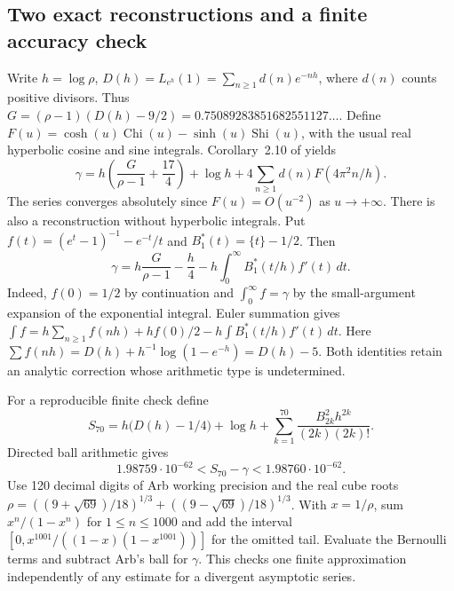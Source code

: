 \documentclass[11pt,a4paper]{article}
\theoremstyle{definition}\newtheorem{definition}[theorem]{Definition}\newtheorem{example}[theorem]{Example}
\theoremstyle{remark}\newtheorem{remark}[theorem]{Remark}
\begin{document}
\subsection{Two exact reconstructions and a finite accuracy check}
Write $h=\log\rho$, $D(h)=L_{e^h}(1)=\sum_{n\ge1}d(n)e^{-nh}$, where $d(n)$ counts positive divisors. Thus
$G=(\rho-1)(D(h)-9/2)=0.75089283851682551127\ldots$.
Define $F(u)=\cosh(u)\operatorname{Chi}(u)-\sinh(u)\operatorname{Shi}(u)$, with the usual real hyperbolic cosine and sine integrals. Corollary~2.10 of \cite{DKK} yields
\begin{equation}\label{eq:plastic-wigert}
 \gamma=h\left(\frac{G}{\rho-1}+\frac{17}{4}\right)+\log h+
 4\sum_{n\ge1}d(n)F(4\pi^2n/h).
\end{equation}
The series converges absolutely since $F(u)=O(u^{-2})$ as $u\to+\infty$.
There is also a reconstruction without hyperbolic integrals. Put
$f(t)=(e^t-1)^{-1}-e^{-t}/t$ and $B_1^*(t)=\{t\}-1/2$. Then
\begin{equation}\label{eq:plastic-euler}
 \gamma=h\frac{G}{\rho-1}-\frac{h}{4}
              -h\int_0^\infty B_1^*(t/h)f'(t)\,dt .
\end{equation}
Indeed, $f(0)=1/2$ by continuation and $\int_0^\infty f=\gamma$ by the small-argument expansion of the exponential integral. Euler summation gives
$\int f=h\sum_{n\ge1}f(nh)+hf(0)/2-h\int B_1^*(t/h)f'(t)\,dt$.
Here $\sum f(nh)=D(h)+h^{-1}\log(1-e^{-h})=D(h)-5$. Both identities retain an analytic correction whose arithmetic type is undetermined.

For a reproducible finite check define
\[
 S_{70}=h\bigl(D(h)-1/4\bigr)+\log h+
 \sum_{k=1}^{70}\frac{B_{2k}^2h^{2k}}{(2k)(2k)!}.
\]
Directed ball arithmetic gives
\[
 1.98759\cdot10^{-62}<S_{70}-\gamma<1.98760\cdot10^{-62}.
\]
Use 120 decimal digits of Arb working precision and the real cube roots
$\rho=((9+\sqrt{69})/18)^{1/3}+((9-\sqrt{69})/18)^{1/3}$.
With $x=1/\rho$, sum $x^n/(1-x^n)$ for $1\le n\le1000$ and add the interval
$[0,x^{1001}/((1-x)(1-x^{1001}))]$ for the omitted tail.
Evaluate the Bernoulli terms and subtract Arb's ball for $\gamma$.
This checks one finite approximation independently of any estimate for a divergent asymptotic series.
\end{document}
